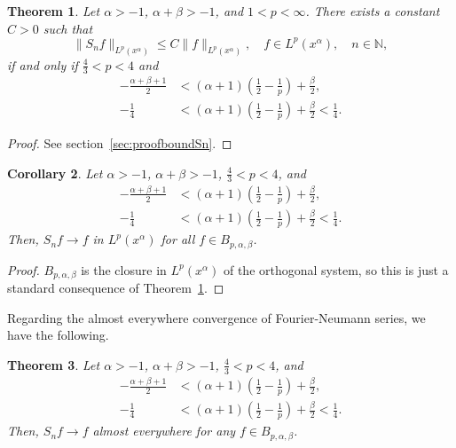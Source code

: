 \documentclass[reqno]{amsart}
\theoremstyle{plain}
\newtheorem{Thm}{Theorem}
\newtheorem{Cor}[Thm]{Corollary} %
\theoremstyle{definition}
\theoremstyle{remark}
\newcommand{\lpnorm}[3]{\|{#1}\|_{L^{#2}({#3})}} %
\begin{document}
\begin{Thm}
\label{th:boundSn}
Let $\alpha>-1$, $\alpha+\beta>-1$, and $1 < p < \infty$. There exists a
constant $C>0$ such that
\begin{equation*}
    \lpnorm{S_nf}p{x^\alpha} \le C\lpnorm{f}p{x^\alpha},
    \quad f \in L^p(x^\alpha), \quad n \in \mathbb{N},
\end{equation*}
if and only if $\frac43<p<4$ and
\begin{equation}
\label{ec:range}
\begin{split}
   - \frac{\alpha+\beta+1}2
   &< (\alpha+1) \left( \frac12 - \frac1p \right) + \frac\beta2,
   \\
   - \frac14
   &< (\alpha+1) \left( \frac12 - \frac1p \right) + \frac\beta2 < \frac14.
\end{split}
\end{equation}
\end{Thm}

\begin{proof}
See section~\ref{sec:proofboundSn}.
\end{proof}

\begin{Cor}
\label{cor:conv}
Let $\alpha > -1$, $\alpha+\beta> -1$, $\frac43 < p < 4$, and
\begin{equation*}
\begin{split}
   - \frac{\alpha+\beta+1}2
   &< (\alpha+1) \left( \frac12 - \frac1p \right) + \frac\beta2,
   \\
   - \frac14
   &< (\alpha+1) \left( \frac12 - \frac1p \right) + \frac\beta2 < \frac14.
\end{split}
\end{equation*}
Then, $S_nf \to f$ in $L^p(x^\alpha)$ for all $f \in B_{p,\alpha,\beta}$.
\end{Cor}

\begin{proof}
$B_{p,\alpha,\beta}$ is the closure in $L^p(x^\alpha)$ of the orthogonal
system, so this is just a standard consequence of Theorem~\ref{th:boundSn}.
\end{proof}

Regarding the almost everywhere convergence of Fourier-Neumann series, we have
the following.

\begin{Thm}
\label{th:convae}
Let $\alpha > -1$, $\alpha+\beta> -1$, $\frac43 < p < 4$, and
\begin{equation*}
\begin{split}
   - \frac{\alpha+\beta+1}2
   &< (\alpha+1) \left( \frac12 - \frac1p \right) + \frac\beta2,
   \\
   - \frac14
   &< (\alpha+1) \left( \frac12 - \frac1p \right) + \frac\beta2 < \frac14.
\end{split}
\end{equation*}
Then, $S_nf \to f$ almost everywhere for any $f \in B_{p,\alpha,\beta}$.
\end{Thm}
\end{document}
